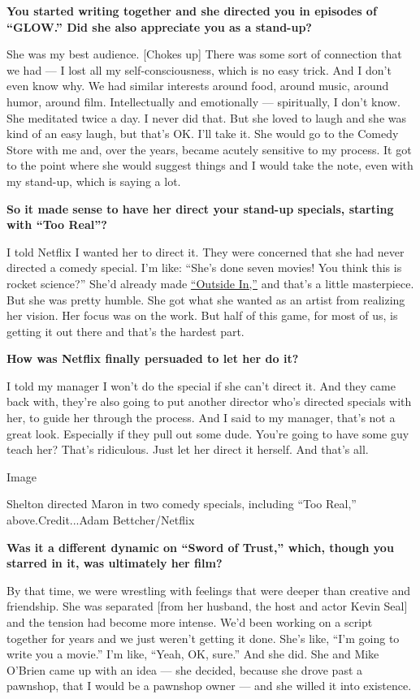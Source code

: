 \textbf{You started writing together and she directed you in episodes of
``GLOW.'' Did she also appreciate you as a stand-up?}

She was my best audience. {[}Chokes up{]} There was some sort of
connection that we had --- I lost all my self-consciousness, which is no
easy trick. And I don't even know why. We had similar interests around
food, around music, around humor, around film. Intellectually and
emotionally --- spiritually, I don't know. She meditated twice a day. I
never did that. But she loved to laugh and she was kind of an easy
laugh, but that's OK. I'll take it. She would go to the Comedy Store
with me and, over the years, became acutely sensitive to my process. It
got to the point where she would suggest things and I would take the
note, even with my stand-up, which is saying a lot.

\textbf{So it made sense to have her direct your stand-up specials,
starting with ``Too Real''?}

I told Netflix I wanted her to direct it. They were concerned that she
had never directed a comedy special. I'm like: ``She's done seven
movies! You think this is rocket science?'' She'd already made
\href{https://www.youtube.com/watch?v=s0SdJfplC80}{``Outside In,''} and
that's a little masterpiece. But she was pretty humble. She got what she
wanted as an artist from realizing her vision. Her focus was on the
work. But half of this game, for most of us, is getting it out there and
that's the hardest part.

\textbf{How was Netflix finally persuaded to let her do it?}

I told my manager I won't do the special if she can't direct it. And
they came back with, they're also going to put another director who's
directed specials with her, to guide her through the process. And I said
to my manager, that's not a great look. Especially if they pull out some
dude. You're going to have some guy teach her? That's ridiculous. Just
let her direct it herself. And that's all.

Image

Shelton directed Maron in two comedy specials, including ``Too Real,''
above.Credit...Adam Bettcher/Netflix

\textbf{Was it a different dynamic on ``Sword of Trust,'' which, though
you starred in it, was ultimately her film?}

By that time, we were wrestling with feelings that were deeper than
creative and friendship. She was separated {[}from her husband, the host
and actor Kevin Seal{]} and the tension had become more intense. We'd
been working on a script together for years and we just weren't getting
it done. She's like, ``I'm going to write you a movie.'' I'm like,
``Yeah, OK, sure.'' And she did. She and Mike O'Brien came up with an
idea --- she decided, because she drove past a pawnshop, that I would be
a pawnshop owner --- and she willed it into existence.


